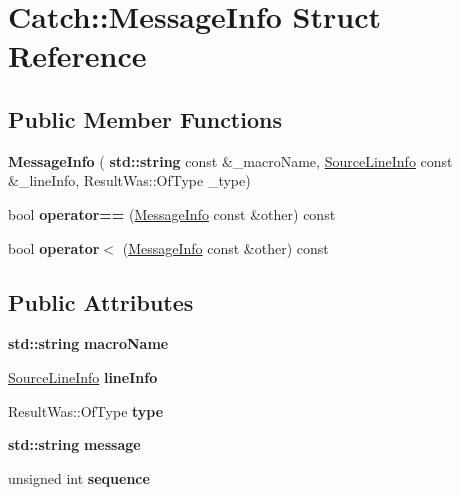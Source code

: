 \hypertarget{struct_catch_1_1_message_info}{}\section{Catch\+:\+:Message\+Info Struct Reference}
\label{struct_catch_1_1_message_info}
\subsection*{Public Member Functions}
\begin{DoxyCompactItemize}
\item 
\mbox{\label{struct_catch_1_1_message_info_a2e336c33ebef7af3c1bbae6a56e14f8a}} 
{\bfseries Message\+Info} (\textbf{ std\+::string} const \&\+\_\+macro\+Name, \hyperlink{struct_catch_1_1_source_line_info}{Source\+Line\+Info} const \&\+\_\+line\+Info, Result\+Was\+::\+Of\+Type \+\_\+type)
\item 
\mbox{\label{struct_catch_1_1_message_info_af4b37f2172ba55395813b4bb6bbbde1a}} 
bool {\bfseries operator==} (\hyperlink{struct_catch_1_1_message_info}{Message\+Info} const \&other) const
\item 
\mbox{\label{struct_catch_1_1_message_info_a8254cb8fca2da02a29a9843cdcb79df1}} 
bool {\bfseries operator$<$} (\hyperlink{struct_catch_1_1_message_info}{Message\+Info} const \&other) const
\end{DoxyCompactItemize}
\subsection*{Public Attributes}
\begin{DoxyCompactItemize}
\item 
\mbox{\label{struct_catch_1_1_message_info_a156ade4b3cc731f6ec7b542ae47ba8e3}} 
\textbf{ std\+::string} {\bfseries macro\+Name}
\item 
\mbox{\label{struct_catch_1_1_message_info_a985165328723e599696ebd8e43195cc5}} 
\hyperlink{struct_catch_1_1_source_line_info}{Source\+Line\+Info} {\bfseries line\+Info}
\item 
\mbox{\label{struct_catch_1_1_message_info_ae928b9117465c696e45951d9d0284e78}} 
Result\+Was\+::\+Of\+Type {\bfseries type}
\item 
\mbox{\label{struct_catch_1_1_message_info_ab6cd06e050bf426c6577502a5c50e256}} 
\textbf{ std\+::string} {\bfseries message}
\item 
\mbox{\label{struct_catch_1_1_message_info_a7f4f57ea21e50160adefce7b68a781d6}} 
unsigned int {\bfseries sequence}
\end{DoxyCompactItemize}


